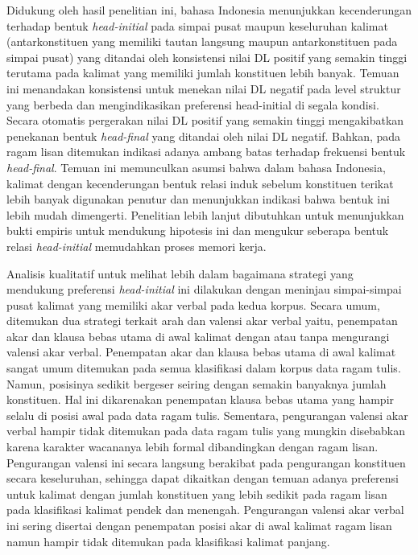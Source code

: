 Didukung oleh hasil penelitian ini, bahasa Indonesia menunjukkan kecenderungan terhadap bentuk \textit{head-initial} pada simpai pusat maupun keseluruhan kalimat (antarkonstituen yang memiliki tautan langsung maupun antarkonstituen pada simpai pusat) yang ditandai oleh konsistensi nilai DL positif yang semakin tinggi terutama pada kalimat yang memiliki jumlah konstituen lebih banyak. Temuan ini menandakan konsistensi untuk menekan nilai DL negatif pada level struktur yang berbeda dan mengindikasikan preferensi head-initial di segala kondisi. Secara otomatis pergerakan nilai DL positif yang semakin tinggi mengakibatkan penekanan bentuk \textit{head-final} yang ditandai oleh nilai DL negatif. Bahkan, pada ragam lisan ditemukan indikasi adanya ambang batas terhadap frekuensi bentuk \textit{head-final}. Temuan ini memunculkan asumsi bahwa dalam bahasa Indonesia, kalimat dengan kecenderungan bentuk relasi induk sebelum konstituen terikat lebih banyak digunakan penutur dan menunjukkan indikasi bahwa bentuk ini lebih mudah dimengerti. Penelitian lebih lanjut dibutuhkan untuk menunjukkan bukti empiris untuk mendukung hipotesis ini dan mengukur seberapa bentuk relasi \textit{head-initial} memudahkan proses memori kerja. 

Analisis kualitatif untuk melihat lebih dalam bagaimana strategi yang mendukung preferensi \textit{head-initial} ini dilakukan dengan meninjau simpai-simpai pusat kalimat yang memiliki akar verbal pada kedua korpus. Secara umum, ditemukan dua strategi terkait arah dan valensi akar verbal yaitu, penempatan akar dan klausa bebas utama di awal kalimat dengan atau tanpa mengurangi valensi akar verbal. Penempatan akar dan klausa bebas utama di awal kalimat sangat umum ditemukan pada semua klasifikasi dalam korpus data ragam tulis. Namun, posisinya sedikit bergeser seiring dengan semakin banyaknya jumlah konstituen. Hal ini dikarenakan penempatan klausa bebas utama yang hampir selalu di posisi awal pada data ragam tulis. Sementara, pengurangan valensi akar verbal hampir tidak ditemukan pada data ragam tulis yang mungkin disebabkan karena karakter wacananya lebih formal dibandingkan dengan ragam lisan. Pengurangan valensi ini secara langsung berakibat pada pengurangan konstituen secara keseluruhan, sehingga dapat dikaitkan dengan temuan adanya preferensi untuk kalimat dengan jumlah konstituen yang lebih sedikit pada ragam lisan pada klasifikasi kalimat pendek dan menengah. Pengurangan valensi akar verbal ini sering disertai dengan penempatan posisi akar di awal kalimat ragam lisan namun hampir tidak ditemukan pada klasifikasi kalimat panjang. 

